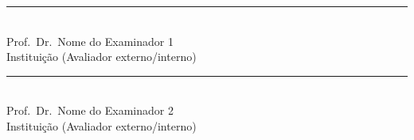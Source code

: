 \begin{folhadeaprovacao}
    \vspace*{\onelineskip}\vspace*{\onelineskip}

    \noindent\rule{\textwidth}{0.4pt}\\
    \noindent Prof.\ Dr.\ Nome do Examinador 1\\
    \noindent Instituição (Avaliador externo/interno)

    \vspace*{\onelineskip}\vspace*{\onelineskip}

    \noindent\rule{\textwidth}{0.4pt}\\
    \noindent Prof.\ Dr.\ Nome do Examinador 2\\
    \noindent Instituição (Avaliador externo/interno)
\end{folhadeaprovacao}
